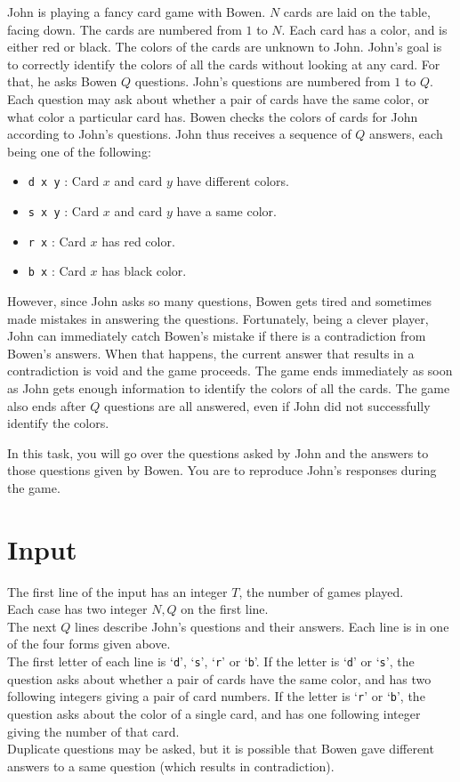 
John is playing a fancy card game with Bowen.
$N$ cards are laid on the table, facing down.
The cards are numbered from $1$ to $N$.
Each card has a color, and is either red or black.
The colors of the cards are unknown to John.
John's goal is to correctly identify the colors of all the cards without looking at any card.
For that, he asks Bowen $Q$ questions.
John's questions are numbered from $1$ to $Q$.
Each question may ask about whether a pair of cards have the same color, or what color a particular card has.
Bowen checks the colors of cards for John according to John's questions.
John thus receives a sequence of $Q$ answers, each being one of the following:

\begin{itemize}
\item {\tt d x y} : Card $x$ and card $y$ have different colors.
\item {\tt s x y} : Card $x$ and card $y$ have a same color.
\item {\tt r x} : Card $x$ has red color.
\item {\tt b x} : Card $x$ has black color.
\end{itemize}


However, since John asks so many questions, Bowen gets tired and sometimes made mistakes in answering the questions.
Fortunately, being a clever player, John can immediately catch Bowen's mistake if there is a contradiction from Bowen's answers.
When that happens, the current answer that results in a contradiction is void and the game proceeds.
The game ends immediately as soon as John gets enough information to identify the colors of all the cards.
The game also ends after $Q$ questions are all answered, even if John did not successfully identify the colors.

In this task, you will go over the questions asked by John and the answers to those questions given by Bowen.
You are to reproduce John's responses during the game.

\section*{Input}
The first line of the input has an integer $T$, the number of games played.\\
Each case has two integer $N, Q$ on the first line.\\
The next $Q$ lines describe John's questions and their answers.
Each line is in one of the four forms given above.\\
The first letter of each line is `{\tt d}', `{\tt s}', `{\tt r}' or `{\tt b}'.
If the letter is `{\tt d}' or `{\tt s}', the question asks about whether a pair of cards have the same color, and has two following integers giving a pair of card numbers.
If the letter is `{\tt r}' or `{\tt b}', the question asks about the color of a single card, and has one following integer giving the number of that card.\\
Duplicate questions may be asked, but it is possible that Bowen gave different answers to a same question (which results in contradiction).
